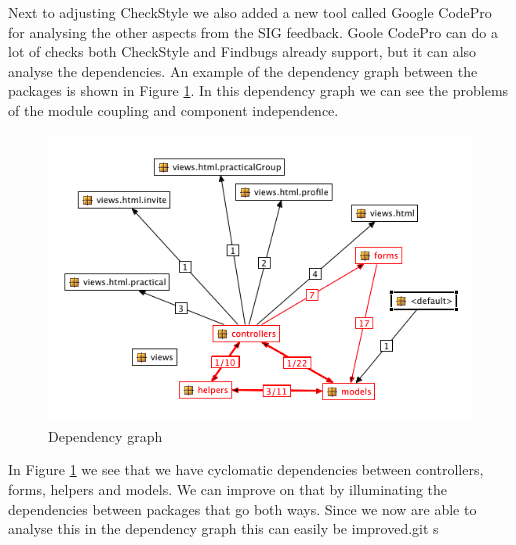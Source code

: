 Next to adjusting CheckStyle we also added a new tool called Google CodePro for analysing the other aspects from the SIG feedback.
Goole CodePro can do a lot of checks both CheckStyle and Findbugs already support, but it can also analyse the dependencies.
An example of the dependency graph between the packages is shown in Figure \ref{dependency_graph}.
In this dependency graph we can see the problems of the module coupling and component independence.

\begin{figure}[H]
    \centering
    \includegraphics[width=\textwidth]{images/dependency_graph}
    \caption{Dependency graph}
    \label{dependency_graph}
\end{figure}

In Figure \ref{dependency_graph} we see that we have cyclomatic dependencies between controllers, forms, helpers and models.
We can improve on that by illuminating the dependencies between packages that go both ways.
Since we now are able to analyse this in the dependency graph this can easily be improved.git s


